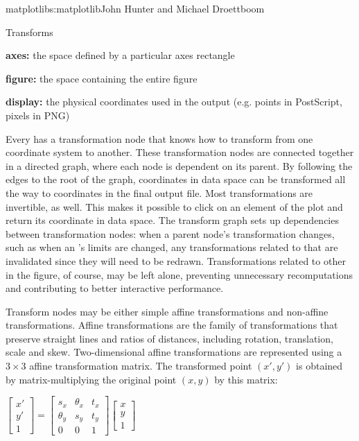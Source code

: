 \begin{aosachapter}{matplotlib}{s:matplotlib}{John Hunter and Michael Droettboom}
\begin{aosasect1}{Transforms}
\begin{aosaitemize}
\item \textbf{axes:} the space defined by a particular axes rectangle

\item \textbf{figure:} the space containing the entire figure

\item \textbf{display:} the physical coordinates used in the output
  (e.g. points in PostScript, pixels in PNG)
\end{aosaitemize}

Every  has a transformation node that knows how to
transform from one coordinate system to another.  These transformation
nodes are connected together in a directed graph, where each node is
dependent on its parent.  By following the edges to the root of the
graph, coordinates in data space can be transformed all the way to
coordinates in the final output file.  Most transformations are
invertible, as well.  This makes it possible to click on an element of
the plot and return its coordinate in data space.  The transform graph
sets up dependencies between transformation nodes: when a parent
node's transformation changes, such as when an 's limits are
changed, any transformations related to that  are invalidated
since they will need to be redrawn.  Transformations related to other
 in the figure, of course, may be left alone, preventing
unnecessary recomputations and contributing to better interactive
performance.

Transform nodes may be either simple affine transformations and
non-affine transformations.  Affine transformations are the family of
transformations that preserve straight lines and ratios of distances,
including rotation, translation, scale and skew.  Two-dimensional
affine transformations are represented using a $3 \times 3$ affine
transformation matrix.  The transformed point $(x\prime, y\prime)$ is
obtained by matrix-multiplying the original point $(x, y)$ by this
matrix:

\medskip
\hspace{20pt}
\begin{math}
\begin{bmatrix} x' \\ y' \\ 1 \end{bmatrix} = \begin{bmatrix} s_x & \theta_x & t_x \\ \theta_y & s_y & t_y \\ 0 & 0 & 1 \end{bmatrix} \begin{bmatrix} x \\ y \\ 1 \end{bmatrix}
\end{math}
\medskip


\end{aosasect1}
\end{aosachapter}

